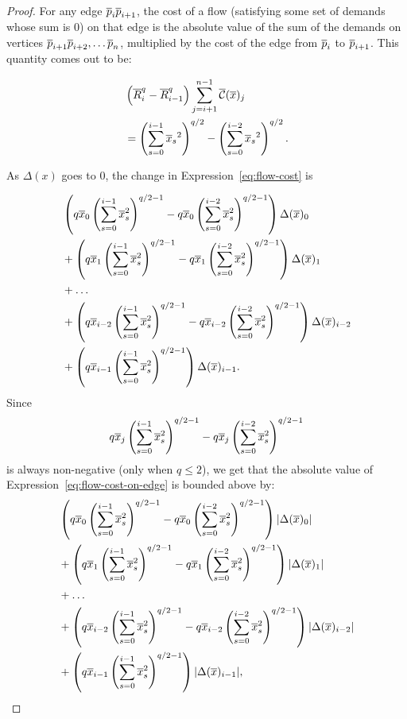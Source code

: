 {\begin{proof} For any edge $\overline{p}_i\overline{p}_{i+1}$, the cost of a flow (satisfying
some set of demands whose sum is $0$) on that edge is the absolute value of
the sum of the demands on vertices $\overline{p}_{i+1} \overline{p}_{i+2}, \ldots \overline{p}_n$,
multiplied by the cost of the edge from $\overline{p}_i$ to $\overline{p}_{i+1}$. This
quantity comes out to be:

\begin{align} &\left(\overline{R}_{i}^q-\overline{R}_{i-1}^q \right) \sum_{j=i+1}^{n-1} \overline{\mathcal{C}}(\overline{x})_j
\\
\label{eq:flow-cost}
&=\left(\sum_{s=0}^{i-1} {\overline{x}_s}^2\right)^{q/2} -\left(\sum_{s=0}^{i-2}
{\overline{x}_s}^2\right)^{q/2}.
\end{align}

As $\Delta(x)$ goes to $0$, the change in Expression~\ref{eq:flow-cost} is

\begin{align}
\begin{split}
\label{eq:flow-cost-on-edge}
&
\left(q\overline{x}_0 \left(\sum_{s=0}^{i-1} \overline{x}_s^2 \right)^{q/2-1} -
q\overline{x}_0\left(\sum_{s=0}^{i-2} \overline{x}_s^2 \right)^{q/2-1} \right) \Delta(\overline{x})_0
\\
&+
\left(q\overline{x}_1 \left(\sum_{s=0}^{i-1} \overline{x}_s^2 \right)^{q/2-1} -
q\overline{x}_1\left(\sum_{s=0}^{i-2}\overline{x}_s^2 \right)^{q/2-1} \right) \Delta(\overline{x})_1
\\
&+ \ldots
\\
&+
\left(q\overline{x}_{i-2} \left(\sum_{s=0}^{i-1} \overline{x}_s^2 \right)^{q/2-1} -
q\overline{x}_{i-2}\left(\sum_{s=0}^{i-2}\overline{x}_s^2 \right)^{q/2-1}
\right)\Delta(\overline{x})_{i-2}
\\
&+
\left(q\overline{x}_{i-1} \left(\sum_{s=0}^{i-1} \overline{x}_s^2
\right)^{q/2-1}\right)\Delta(\overline{x})_{i-1}.
\end{split}
\end{align}
Since 
\[
q\overline{x}_j\left(\sum_{s=0}^{i-1} \overline{x}_s^2\right)^{q/2-1} - q\overline{x}_j\left(\sum_{s=0}^{i-2}
\overline{x}_s^2 \right)^{q/2-1}\]
is always non-negative (only when $q \leq 2$), we get that the absolute value of
Expression~\ref{eq:flow-cost-on-edge} is bounded above by:
\begin{align}
\begin{split}
\label{eq:flow-cost-upper-bound}
&
\left(q\overline{x}_0 \left(\sum_{s=0}^{i-1} \overline{x}_s^2 \right)^{q/2-1} -
q\overline{x}_0\left(\sum_{s=0}^{i-2} \overline{x}_s^2 \right)^{q/2-1} \right)
|\Delta(\overline{x})_0|
\\
&+
\left(q\overline{x}_1 \left(\sum_{s=0}^{i-1} \overline{x}_s^2 \right)^{q/2-1} -
q\overline{x}_1\left(\sum_{s=0}^{i-2}\overline{x}_s^2 \right)^{q/2-1} \right) |\Delta(\overline{x})_1|
\\
&+ \ldots
\\
&+
\left(q\overline{x}_{i-2} \left(\sum_{s=0}^{i-1} \overline{x}_s^2 \right)^{q/2-1} -
q\overline{x}_{i-2}\left(\sum_{s=0}^{i-2}\overline{x}_s^2 \right)^{q/2-1}
\right)|\Delta(\overline{x})_{i-2}|
\\
&+
\left(q\overline{x}_{i-1} \left(\sum_{s=0}^{i-1} \overline{x}_s^2
\right)^{q/2-1}\right)|\Delta(\overline{x})_{i-1}|,
\end{split}
\end{align}


\end{proof}}
